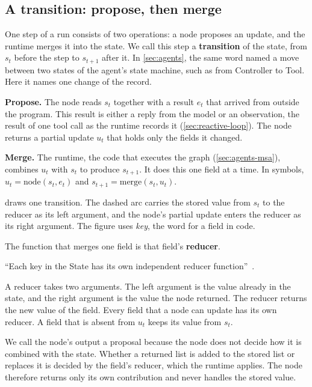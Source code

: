 \subsection{A transition: propose, then merge}
\label{sec:state-transition}

One step of a run consists of two operations: a node proposes an update, and the runtime merges it
into the state. We call this step a \textbf{transition} of the state, from $s_t$ before the step to
$s_{t+1}$ after it. In \cref{sec:agents}, the same word named a move between two states of the
agent's state machine, such as from Controller to Tool. Here it names one change of the record.
\bi
\item \textbf{Propose.} The node reads $s_t$ together with a result $e_t$ that arrived from outside
the program. This result is either a reply from the model or an observation, the result of one tool
call as the runtime records it (\cref{sec:reactive-loop}). The node returns a partial update $u_t$ that
holds only the fields it changed.
\item \textbf{Merge.} The runtime, the code that executes the graph (\cref{sec:agents-msa}),
combines $u_t$ with $s_t$ to produce $s_{t+1}$. It does this one field at a time.
\ei
In symbols, $u_t = \mathrm{node}(s_t, e_t)$ and $s_{t+1} = \mathrm{merge}(s_t, u_t)$.

 draws one transition. The dashed arc carries the stored value from
$s_t$ to the reducer as its left argument, and the node's partial update enters the reducer as its
right argument. The figure uses \emph{key}, the word for a field in code.

The function that merges one field is that field's \textbf{reducer}.

\begin{definition}[Reducer]
\label{def:state-reducer}
``Each key in the State has its own independent reducer function''~\citep{langgraph-graph-api}.
\end{definition}

A reducer takes two arguments. The left argument is the value already in the state, and the right
argument is the value the node returned. The reducer returns the new value of the field. Every field
that a node can update has its own reducer. A field that is absent from $u_t$ keeps its value from
$s_t$.

We call the node's output a proposal because the node does not decide how it is combined with the
state. Whether a returned list is added to the stored list or replaces it is decided by the field's
reducer, which the runtime applies. The node therefore returns only its own contribution and never
handles the stored value.

